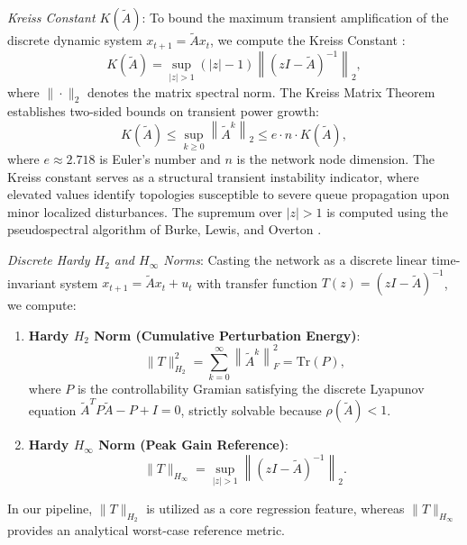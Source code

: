 \documentclass[journal]{IEEEtran}
\begin{document}
\textit{Kreiss Constant $K(\tilde{A})$}: To bound the maximum transient amplification of the discrete dynamic system $x_{t+1} = \tilde{A} x_t$, we compute the Kreiss Constant \cite{Kreiss1962}:
\begin{equation}
K(\tilde{A}) = \sup_{|z| > 1} (|z| - 1) \left\| (zI - \tilde{A})^{-1} \right\|_2,
\end{equation}
where $\|\cdot\|_2$ denotes the matrix spectral norm. The Kreiss Matrix Theorem establishes two-sided bounds on transient power growth:
\begin{equation}
K(\tilde{A}) \le \sup_{k \ge 0} \left\| \tilde{A}^k \right\|_2 \le e \cdot n \cdot K(\tilde{A}),
\end{equation}
where $e \approx 2.718$ is Euler's number and $n$ is the network node dimension. The Kreiss constant serves as a structural transient instability indicator, where elevated values identify topologies susceptible to severe queue propagation upon minor localized disturbances. The supremum over $|z| > 1$ is computed using the pseudospectral algorithm of Burke, Lewis, and Overton \cite{Burke2003}.

\textit{Discrete Hardy $H_2$ and $H_\infty$ Norms}: Casting the network as a discrete linear time-invariant system $x_{t+1} = \tilde{A} x_t + u_t$ with transfer function $T(z) = (zI - \tilde{A})^{-1}$, we compute:
\begin{enumerate}
    \item \textbf{Hardy $H_2$ Norm (Cumulative Perturbation Energy)}:
    \begin{equation}
    \|T\|_{H_2}^2 = \sum_{k=0}^{\infty} \left\| \tilde{A}^k \right\|_F^2 = \text{Tr}(P),
    \end{equation}
    where $P$ is the controllability Gramian satisfying the discrete Lyapunov equation $\tilde{A}^T P \tilde{A} - P + I = 0$, strictly solvable because $\rho(\tilde{A}) < 1$.
    \item \textbf{Hardy $H_\infty$ Norm (Peak Gain Reference)}:
    \begin{equation}
    \|T\|_{H_\infty} = \sup_{|z| > 1} \left\| (zI - \tilde{A})^{-1} \right\|_2.
    \end{equation}
\end{enumerate}
In our pipeline, $\|T\|_{H_2}$ is utilized as a core regression feature, whereas $\|T\|_{H_\infty}$ provides an analytical worst-case reference metric.
\end{document}
